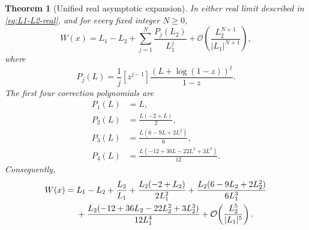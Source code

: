 \documentclass[11pt]{article}
\numberwithin{equation}{section}
\newtheorem{theorem}{Theorem}[section]
\theoremstyle{definition}
\theoremstyle{remark}
\begin{document}
\begin{theorem}[Unified real asymptotic expansion]
\label{thm:unified-asymptotic}
In either real limit described in \eqref{eq:L1-L2-real}, and for every fixed
integer $N\ge0$,
\begin{equation}
 W(x)=L_1-L_2+\sum_{j=1}^{N}\frac{P_j(L_2)}{L_1^j}
 +\mathcal O\!\left(\frac{L_2^{N+1}}{|L_1|^{N+1}}\right),               \label{eq:asymptotic-P}
\end{equation}
where
\begin{equation}
 P_j(L)=\frac1j[z^{j-1}]
       \frac{(L+\log(1-z))^j}{1-z}.                   \label{eq:Pj-coeff}
\end{equation}
The first four correction polynomials are
\begin{align}
 P_1(L)&=L,\\
 P_2(L)&=\frac{L(-2+L)}2,\\
 P_3(L)&=\frac{L(6-9L+2L^2)}6,\\
 P_4(L)&=\frac{L(-12+36L-22L^2+3L^3)}{12}.            \label{eq:first-P-polynomials}
\end{align}
Consequently,
\begin{align}
W(x)={}&L_1-L_2+\frac{L_2}{L_1}
 +\frac{L_2(-2+L_2)}{2L_1^2}
 +\frac{L_2(6-9L_2+2L_2^2)}{6L_1^3}\notag\\
&+\frac{L_2(-12+36L_2-22L_2^2+3L_2^3)}{12L_1^4}
 +\mathcal O\!\left(\frac{L_2^5}{|L_1|^5}\right).    \label{eq:asymptotic-first-four}
\end{align}
\end{theorem}
\end{document}
